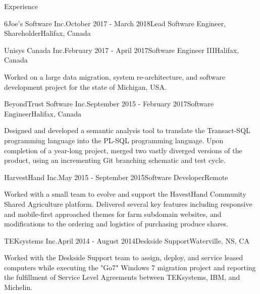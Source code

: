 \documentclass{resume} %
\begin{document}
\begin{rSection}{Experience}
\begin{rSubsection}{6Joe's Software Inc.}{October 2017 - March 2018}{Lead Software Engineer, Shareholder}{Halifax, Canada}
\end{rSubsection}


\begin{rSubsection}{Unisys Canada Inc.}{February 2017 - April 2017}{Software Engineer III}{Halifax, Canada}

\item[] Worked on a large data migration, system re-architecture, and software development project for the state of Michigan, USA.

\end{rSubsection}


\begin{rSubsection}{BeyondTrust Software Inc.}{September 2015 - February 2017}{Software Engineer}{Halifax, Canada}

\item[] Designed and developed a semantic analysis tool to translate the Transact-SQL programming language into the PL-SQL programming language. Upon completion of a year-long project, merged two vastly diverged versions of the product, using an incrementing Git branching schematic and test cycle.

\end{rSubsection}



\begin{rSubsection}{HarvestHand Inc.}{May 2015 - September 2015}{Software Developer}{Remote}

\item[] Worked with a small team to evolve and support the HavestHand Community Shared Agriculture platform. Delivered several key features including responsive and mobile-first approached themes for farm subdomain websites, and modifications to the ordering and logistics of purchasing produce shares.

\end{rSubsection}


\begin{rSubsection}{TEKsystems Inc.}{April 2014 - August 2014}{Deskside Support}{Waterville, NS, CA}
\item[] Worked with the Deskside Support team to assign, deploy, and service leased computers while executing the "Go7" Windows 7 migration project and reporting the fulfillment of Service Level Agreements between TEKsystems, IBM, and Michelin.
\end{rSubsection}



\end{rSection}
\end{document}
